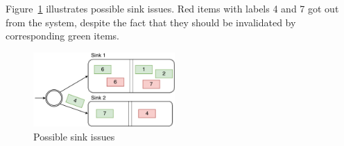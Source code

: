 Figure~\ref{invalidation-problems-figure} illustrates possible sink issues. Red items with labels 4 and 7 got out from the system, despite the fact that they should be invalidated by corresponding green items. 

\begin{figure}[htbp]
  \centering
  \includegraphics[width=0.48\textwidth]{pics/invalidation_problems}
  \caption{Possible sink issues}
  \label {invalidation-problems-figure}
\end{figure}
